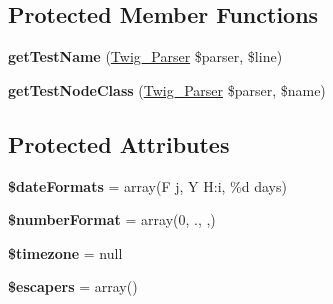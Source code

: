 \subsection*{Protected Member Functions}
\begin{DoxyCompactItemize}
\item 
\hypertarget{class_twig___extension___core_aedd5badc969eb7c64b3d67e874487028}{}{\bfseries get\+Test\+Name} (\hyperlink{class_twig___parser}{Twig\+\_\+\+Parser} \$parser, \$line)\label{class_twig___extension___core_aedd5badc969eb7c64b3d67e874487028}

\item 
\hypertarget{class_twig___extension___core_a0600ab37d2ceee19a453ba0c7fa6d911}{}{\bfseries get\+Test\+Node\+Class} (\hyperlink{class_twig___parser}{Twig\+\_\+\+Parser} \$parser, \$name)\label{class_twig___extension___core_a0600ab37d2ceee19a453ba0c7fa6d911}

\end{DoxyCompactItemize}
\subsection*{Protected Attributes}
\begin{DoxyCompactItemize}
\item 
\hypertarget{class_twig___extension___core_a2fc93ea5327f655d3ed306e221ee33f0}{}{\bfseries \$date\+Formats} = array(\textquotesingle{}F j, Y H\+:i\textquotesingle{}, \textquotesingle{}\%d days\textquotesingle{})\label{class_twig___extension___core_a2fc93ea5327f655d3ed306e221ee33f0}

\item 
\hypertarget{class_twig___extension___core_a352ef5f1b2f5974072bd8037e20446c9}{}{\bfseries \$number\+Format} = array(0, \textquotesingle{}.\textquotesingle{}, \textquotesingle{},\textquotesingle{})\label{class_twig___extension___core_a352ef5f1b2f5974072bd8037e20446c9}

\item 
\hypertarget{class_twig___extension___core_af1cceca0f6633f202e2e3eccb72912af}{}{\bfseries \$timezone} = null\label{class_twig___extension___core_af1cceca0f6633f202e2e3eccb72912af}

\item 
\hypertarget{class_twig___extension___core_aa3a97e2818a50c6d398a50066a02976c}{}{\bfseries \$escapers} = array()\label{class_twig___extension___core_aa3a97e2818a50c6d398a50066a02976c}

\end{DoxyCompactItemize}


